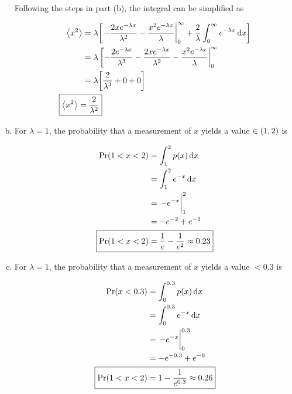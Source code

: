 \documentclass[12pt,a4paper,twocolumn]{article}
\begin{document}
\begin{enumerate}[(a)]
Following the steps in part (b), the integral can be simplified as

\begin{align}
	\ev{x^2} &= \lambda \qty[\eval{-\frac{2xe^{-\lambda x}}{\lambda^2} - \frac{x^2 e^{-\lambda x}}{\lambda}}_0^\infty + \frac{2}{\lambda}\int_0^\infty e^{-\lambda x}\dd{x}] \nonumber \\
	&= \lambda \eval[-\frac{2e^{-\lambda x}}{\lambda^3} - \frac{2xe^{-\lambda x}}{\lambda^2} - \frac{x^2 e^{-\lambda x}}{\lambda}|_0^\infty \nonumber \\
	&= \lambda\qty[\frac{2}{\lambda^3} + 0 + 0] \nonumber \\
	\Aboxed{
		\ev{x^2} &= \frac{2}{\lambda^2}
	} \label{eq:answer-c}
\end{align}

\item For $\lambda = 1$, the probability that a measurement of $x$ yields a value $\in \qty(1,2)$ is

\begin{align}
	\Pr(1 < x < 2) &= \int_1^2 p(x) \dd{x} \\
	&= \int_1^2 e^{-x} \dd{x} \nonumber \\
	&= \eval{-e^{-x}}_1^2 \nonumber \\
	&= -e^{-2} + e^{-1} \nonumber \\
	\Aboxed{
		\Pr(1<x<2) &= \frac{1}{e} - \frac{1}{e^2} \approx 0.23
	} \label{eq:answer-d}
\end{align}

\item For $\lambda = 1$, the probability that a measurement of $x$ yields a value $< 0.3$ is

\begin{align}
	\Pr(x<0.3) &= \int_0^{0.3} p(x) \dd{x} \\
	&= \int_0^{0.3} e^{-x} \dd{x} \nonumber \\
	&= \eval{-e^{-x}}_0^{0.3} \nonumber \\
	&= -e^{-0.3} + e^{-0} \nonumber \\
	\Aboxed{
		\Pr(1<x<2) &= 1 - \frac{1}{e^{0.3}} \approx 0.26
	} \label{eq:answer-e}
\end{align}

\end{enumerate}
\end{document}
